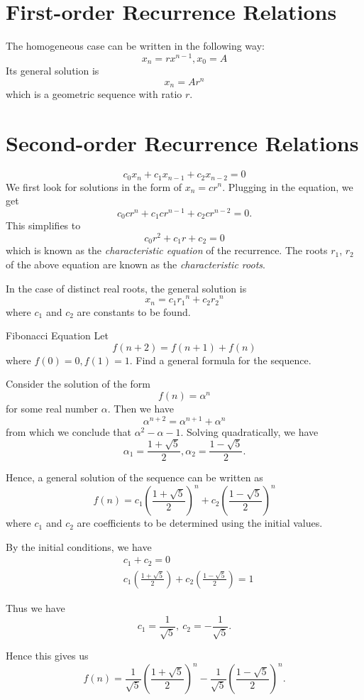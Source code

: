 \section{First-order Recurrence Relations}
The homogeneous case can be written in the following way: \[ x_n = r x^{n-1}, x_0 = A \] 
Its general solution is \[ x_n = A r^n \]
which is a geometric sequence with ratio $r$.

\section{Second-order Recurrence Relations}
\[ c_0 x_n + c_1 x_{n-1} + c_2 x_{n-2} = 0 \]
We first look for solutions in the form of $x_n = c r^n$. Plugging in the equation, we get
\[ c_0 c r^n + c_1 c r^{n-1} + c_2 c r^{n-2} = 0. \] 
This simplifies to
\[ c_0 r^2 + c_1 r + c_2 = 0 \] 
which is known as the \emph{characteristic equation} of the recurrence. 
The roots $r_1$, $r_2$ of the above equation are known as the \emph{characteristic roots}.

In the case of distinct real roots, the general solution is 
\[ x_n  = c_1 {r_1}^n + c_2 {r_2}^n \]
where $c_1$ and $c_2$ are constants to be found.

\begin{exmp}{Fibonacci Equation}{} 
Let \[ f(n+2) = f(n+1) + f(n) \] 
where $f(0) = 0, f(1) = 1$. Find a general formula for the sequence.
\end{exmp} 

\begin{solution}
Consider the solution of the form \[ f(n) = \alpha^n \] for some real number $\alpha$. Then we have \[ \alpha^{n+2} = \alpha^{n+1} + \alpha^n \] from which we conclude that $\alpha^2 - \alpha - 1$. Solving quadratically, we have \[ \alpha_1 = \frac{1+\sqrt{5}}{2}, \alpha_2 = \frac{1-\sqrt{5}}{2}. \] 

Hence, a general solution of the sequence can be written as \[ f(n) = c_1 \left(\frac{1+\sqrt{5}}{2}\right)^n + c_2 \left(\frac{1-\sqrt{5}}{2}\right)^n \] where $c_1$ and $c_2$ are coefficients to be determined using the initial values.

By the initial conditions, we have 
\begin{align*}
& c_1 + c_2 = 0 \\
& c_1 \left(\frac{1+\sqrt{5}}{2}\right) + c_2 \left(\frac{1-\sqrt{5}}{2}\right) = 1
\end{align*}

Thus we have \[ c_1 = \frac{1}{\sqrt{5}},\:c_2 = - \frac{1}{\sqrt{5}}. \] 

Hence this gives us \[ \boxed{f(n) = \frac{1}{\sqrt{5}} \left(\frac{1+\sqrt{5}}{2}\right)^n - \frac{1}{\sqrt{5}} \left(\frac{1-\sqrt{5}}{2}\right)^n}. \]
\end{solution}

